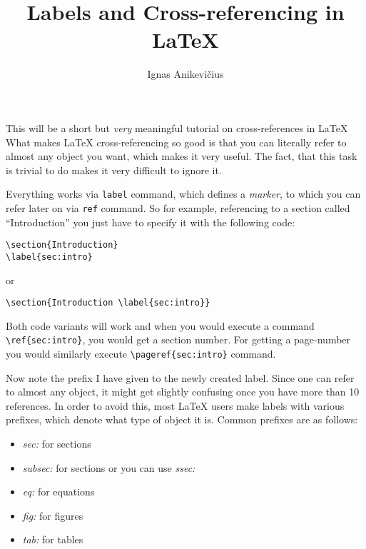 \documentclass[
]{scrartcl}
\title{Labels and Cross-referencing in \LaTeX{}}
\author{Ignas Anikevičius}
\begin{document}
\maketitle

This will be a short but \emph{very} meaningful tutorial on cross-references in
\LaTeX{}
%
What makes \LaTeX{} cross-referencing so good is that you can literally refer to
    almost any object you want, which makes it very useful.
%
The fact, that this task is trivial to do makes it very difficult to ignore it.

%    
Everything works via \verb|label| command, which defines a \emph{marker}, to
    which you can refer later on via \verb|ref| command.
%
So for example, referencing to a section called ``Introduction'' you just have
    to specify it with the following code:
%
\begin{lstlisting}
\section{Introduction}
\label{sec:intro}
\end{lstlisting}
%
or
%
\begin{lstlisting}
\section{Introduction \label{sec:intro}}
\end{lstlisting}
%
Both code variants will work and when you would execute a command
    \verb|\ref{sec:intro}|, you would get a section number.
%
For getting a page-number you would similarly execute 
    \verb|\pageref{sec:intro}| command.

%
Now note the prefix I have given to the newly created label.
%
Since one can refer to almost any object, it might get slightly confusing once
    you have more than 10 references.
%
In order to avoid this, most \LaTeX{} users make labels with various prefixes,
    which denote what type of object it is.
%
Common prefixes are as follows:
%
\begin{itemize}
    \item \emph{sec:} for sections
    \item \emph{subsec:} for sections or you can use \emph{ssec:}
    \item \emph{eq:} for equations
    \item \emph{fig:} for figures
    \item \emph{tab:} for tables
\end{itemize}
\end{document}
